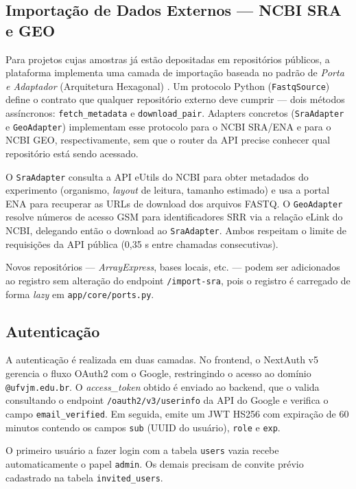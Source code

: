 \subsection{Importação de Dados Externos — NCBI SRA e GEO}
\label{sec:ncbi}

Para projetos cujas amostras já estão depositadas em repositórios
públicos, a plataforma implementa uma camada de importação baseada no
padrão de \textit{Porta e Adaptador} (Arquitetura Hexagonal)
\cite{cockburn2005hexagonal}. Um protocolo Python (\texttt{FastqSource})
define o contrato que qualquer repositório externo deve cumprir —
dois métodos assíncronos: \texttt{fetch\_metadata} e
\texttt{download\_pair}. Adapters concretos (\texttt{SraAdapter} e
\texttt{GeoAdapter}) implementam esse protocolo para o NCBI SRA/ENA
e para o NCBI GEO, respectivamente, sem que o router da API precise
conhecer qual repositório está sendo acessado.

O \texttt{SraAdapter} consulta a API eUtils do NCBI para obter
metadados do experimento (organismo, \textit{layout} de leitura,
tamanho estimado) e usa a portal ENA para recuperar as URLs de download
dos arquivos FASTQ. O \texttt{GeoAdapter} resolve números de acesso
GSM para identificadores SRR via a relação eLink do NCBI, delegando
então o download ao \texttt{SraAdapter}. Ambos respeitam o limite de
requisições da API pública (0,35 s entre chamadas consecutivas).

Novos repositórios — \textit{ArrayExpress}, bases locais, etc. — podem
ser adicionados ao registro sem alteração do endpoint
\texttt{/import-sra}, pois o registro é carregado de forma
\textit{lazy} em \texttt{app/core/ports.py}.

\subsection{Autenticação}

A autenticação é realizada em duas camadas. No frontend, o NextAuth v5
gerencia o fluxo OAuth2 com o Google, restringindo o acesso ao domínio
\texttt{@ufvjm.edu.br}. O \textit{access\_token} obtido é enviado ao
backend, que o valida consultando o endpoint
\texttt{/oauth2/v3/userinfo} da API do Google e verifica o campo
\texttt{email\_verified}. Em seguida, emite um JWT HS256 com expiração
de 60 minutos contendo os campos \texttt{sub} (UUID do usuário),
\texttt{role} e \texttt{exp}.

O primeiro usuário a fazer login com a tabela \texttt{users} vazia
recebe automaticamente o papel \texttt{admin}. Os demais precisam de
convite prévio cadastrado na tabela \texttt{invited\_users}.

